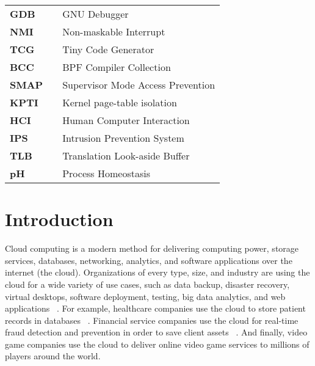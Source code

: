 \documentclass{report}
\begin{document}
\begin{spacing}{1.5}
\begin{longtable}{lcl}
\large{\bf GDB}  & & \large{GNU Debugger} \\
\large{\bf NMI}  & & \large{Non-maskable Interrupt} \\
\large{\bf TCG}  & & \large{Tiny Code Generator} \\
\large{\bf BCC}  & & \large{BPF Compiler Collection} \\
\large{\bf SMAP}  & & \large{Supervisor Mode Access Prevention} \\
\large{\bf KPTI}  & & \large{Kernel page-table isolation} \\
\large{\bf HCI}  & & \large{Human Computer Interaction} \\
\large{\bf IPS}  & & \large{Intrusion Prevention System} \\
\large{\bf TLB}  & & \large{Translation Look-aside Buffer} \\
\large{\bf pH}  & & \large{Process Homeostasis} \\
\end{longtable}
















\newpage
\chapter{Introduction}

{\large
Cloud computing is a modern method for delivering computing power, storage services, databases, networking, analytics, and software applications over the internet (the cloud). Organizations of every type, size, and industry are using the cloud for a wide variety of use cases, such as data backup, disaster recovery, virtual desktops, software deployment, testing, big data analytics, and web applications ~\cite{BELLO2021103441}. For example, healthcare companies use the cloud to store patient records in databases ~\cite{BELLO2021103441}. Financial service companies use the cloud for real-time fraud detection and prevention in order to save client assets ~\cite{BELLO2021103441}. And finally, video game companies use the cloud to deliver online video game services to millions of players around the world.
\newline
}


\end{spacing}
\end{document}
